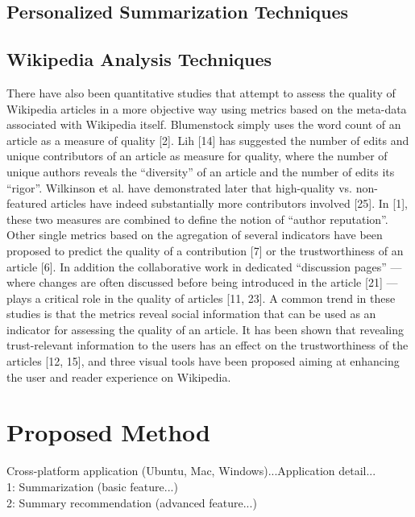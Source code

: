 \documentclass[12pt]{article}
\begin{document}
\subsection{Personalized Summarization Techniques}
    
    
    
\subsection{Wikipedia Analysis Techniques}
There have also been quantitative studies that attempt to assess the
quality of Wikipedia articles in a more objective way using metrics based on the meta-data associated with Wikipedia itself. Blumenstock simply uses the word count of an article as a measure of
quality [2]. Lih [14] has suggested the number of edits and unique
contributors of an article as measure for quality, where the number
of unique authors reveals the “diversity” of an article and the number of edits its “rigor”. Wilkinson et al. have demonstrated later
that high-quality vs. non-featured articles have indeed substantially
more contributors involved [25]. In [1], these two measures are
combined to define the notion of “author reputation”. Other single metrics based on the agregation of several indicators have been
proposed to predict the quality of a contribution [7] or the trustworthiness of an article [6]. In addition the collaborative work in
dedicated “discussion pages” — where changes are often discussed
before being introduced in the article [21] — plays a critical role in
the quality of articles [11, 23].
A common trend in these studies is that the metrics reveal social
information that can be used as an indicator for assessing the quality of an article. It has been shown that revealing trust-relevant
information to the users has an effect on the trustworthiness of the
articles [12, 15], and three visual tools have been proposed aiming
at enhancing the user and reader experience on Wikipedia.



\section{Proposed Method}\label{sec:Proposed}

Cross-platform application (Ubuntu, Mac, Windows)...Application detail...\\
1: Summarization (basic feature...)\\
2: Summary recommendation (advanced feature...)
\end{document}
